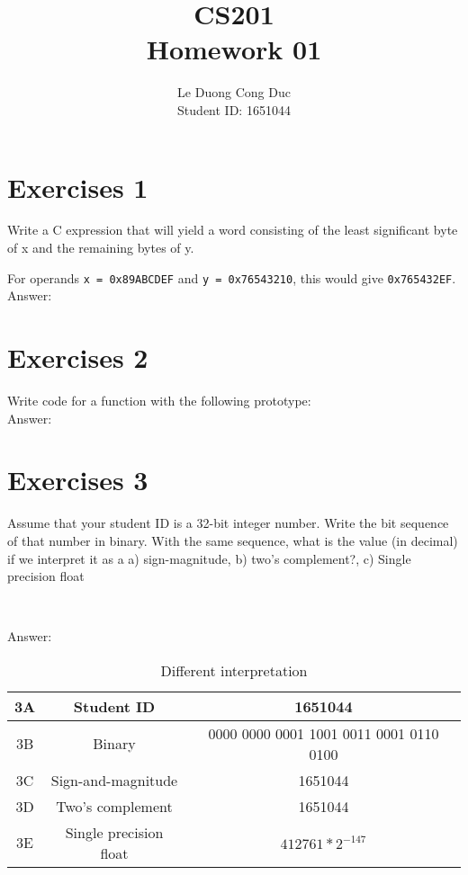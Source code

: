 \documentclass[a4paper]{article}
\begin{document}
\author{Le Duong Cong Duc \\ Student ID: 1651044} %
\title{CS201\\Homework 01}
\maketitle


\setcounter{page}{1}
\tableofcontents
{}

\clearpage


\section{Exercises 1}
Write a C expression that will yield a word consisting of the least significant byte of x and the remaining bytes of y.

For operands \texttt{x = 0x89ABCDEF} and \texttt{y = 0x76543210}, this would give \texttt{0x765432EF}.\\[1pt]

Answer: %


\section{Exercises 2}
Write code for a function with the following prototype:\\[1pt]

Answer: %


\section{Exercises 3}
Assume that your student ID is a 32-bit integer number. Write the bit sequence of that number in binary. With the same sequence, what is the value (in decimal) if we interpret it as a a) sign-magnitude, b) two's complement?, c) Single precision float

~\newline

Answer: %

\begin{table}[h]
\begin{center}
\begin{tabular}{|c|c|c|}
\hline
3A & Student ID & 1651044 \\
\hline
3B & Binary & 0000 0000 0001 1001 0011 0001 0110 0100 \\
\hline
3C & Sign-and-magnitude & 1651044 \\
\hline
3D & Two's complement & 1651044 \\
\hline
3E & Single precision float & $412761*2^{-147}$\\
\hline

\end{tabular}
\caption{Different interpretation}
\end{center}
\end{table}
\end{document}

